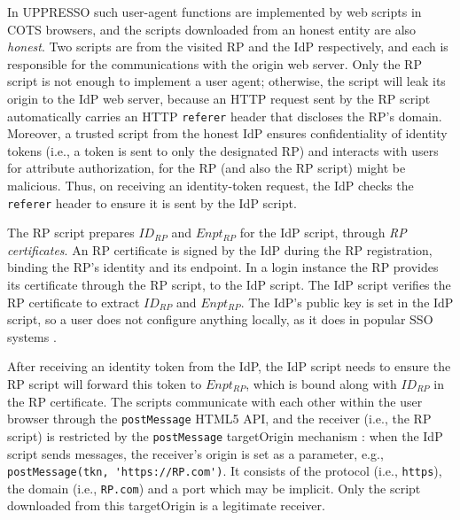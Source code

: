 In UPPRESSO such user-agent functions are implemented by web scripts in COTS browsers,
and the scripts downloaded from an honest entity are also \emph{honest}.
Two scripts are from the visited RP and the IdP respectively,
    and each is responsible for the communications with the origin web server.
Only the RP script is not enough to implement a user agent;
    otherwise, the script will leak its origin to the IdP web server,
    because
    an HTTP request sent by the RP script
automatically carries an HTTP \verb+referer+ header that discloses the RP's domain.
Moreover, a trusted script from the honest IdP
ensures confidentiality of identity tokens (i.e., a token is sent to only the designated RP)
and interacts with users for attribute authorization,
    for the RP (and also the RP script) might be malicious.
Thus, on receiving an identity-token request,
    the IdP checks the \verb+referer+ header to ensure it is sent by the IdP script.

The RP script prepares $ID_{RP}$ and $Enpt_{RP}$ for the IdP script, through \emph{RP certificates}.
An RP certificate is signed by the IdP during the RP registration,
     binding the RP's identity and its endpoint. %
In a login instance
    the RP provides its certificate through the RP script, to the IdP script.
The IdP script %
    verifies the RP certificate to extract $ID_{RP}$ and $Enpt_{RP}$.
The IdP's public key is set in the IdP script, so
 a user does not configure anything locally,
    as it does in popular SSO systems \cite{OpenIDConnect, rfc6749, SAML,SAMLIdentifier}.




After %
 receiving an identity token from the IdP,
    the IdP script needs to ensure the RP script will forward this token to $Enpt_{RP}$,
        which is bound along with $ID_{RP}$ in the RP certificate.
The scripts communicate with each other within the user browser through the \verb+postMessage+ HTML5 API,
and the receiver (i.e., the RP script)
 is restricted by the \verb+postMessage+ targetOrigin mechanism \cite{postm-targeto}:
when the IdP script sends messages,
 the receiver's origin is set as a parameter,
  e.g., \verb+postMessage(tkn, 'https://RP.com')+.
It consists of
    the protocol (i.e., \verb+https+),
    the domain  (i.e., \verb+RP.com+)
    and a port which may be implicit.
Only the script downloaded from this targetOrigin is a legitimate receiver.

